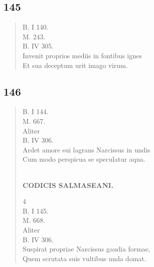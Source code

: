 \documentclass[11pt, a4paper]{report}
\begin{document}
            \subsection*{145}
      \begin{verse}
      B. I 140. \\ M. 243. \\ B. IV 305. \\ Invenit proprios mediis in fontibus ignes \\ Et sua deceptum urit imago virum. \\ 
      \end{verse}
  
            \subsection*{146}
      \begin{verse}
      B. I 144. \\ M. 667. \\ Aliter \\ B. IV 306. \\ Ardet amore sui lagrans Narcissus in undis \\ Cum modo perspicua se speculatur aqua. \\ 
        ﻿\pagebreak 
    \begin{center} \textbf{CODICIS SALMASEANI.} \end{center} \marginpar{[143]} 4 \\ B. I 145. \\ M. 668. \\ Aliter \\ B. IV 306. \\ Suspirat propriae Narcissus gaudia formae, \\ Quem scrutata suis vultibus unda domat. \\ 
      \end{verse}
  
\end{document}
